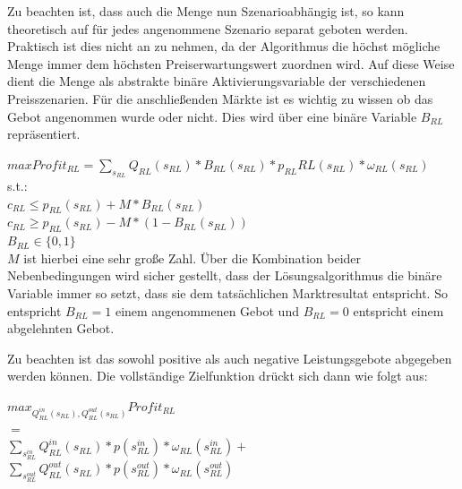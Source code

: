 Zu beachten ist, dass auch die Menge nun Szenarioabhängig ist, so kann theoretisch auf für jedes angenommene Szenario separat geboten werden. Praktisch ist dies nicht an zu nehmen, da der Algorithmus die höchst mögliche Menge immer dem höchsten Preiserwartungswert  zuordnen wird. Auf diese Weise dient die Menge als abstrakte binäre Aktivierungsvariable der verschiedenen Preisszenarien.
Für die anschließenden Märkte ist es wichtig zu wissen ob das Gebot angenommen wurde oder nicht. Dies wird über eine binäre Variable $B_{RL}$ repräsentiert.

$max Profit_{RL} = \sum_{s_{RL}} Q_{RL}(s_{RL}) * B_{RL}(s_{RL}) * p_{RL}{RL}(s_{RL}) * \omega_{RL}(s_{RL})$\\
s.t.:\\
$c_{RL} \leq p_{RL}(s_{RL}) + M * B_{RL}(s_{RL}) $\\
$c_{RL} \geq p_{RL}(s_{RL}) - M * (1 - B_{RL}(s_{RL})) $\\
$B_{RL} \in \{0,1\}$\\
$M$ ist hierbei eine sehr große Zahl. Über die Kombination beider Nebenbedingungen wird sicher gestellt, dass der Lösungsalgorithmus die binäre Variable immer so setzt, dass sie dem tatsächlichen Marktresultat entspricht. So entspricht $B_{RL} = 1$ einem angenommenen Gebot und $B_{RL} = 0$ entspricht einem abgelehnten Gebot.\\




Zu beachten ist das sowohl positive als auch negative Leistungsgebote abgegeben werden können. Die vollständige Zielfunktion drückt sich dann wie folgt aus:\\

\begin{center}
	$max_{Q^{in}_{RL}(s_{RL}), Q^{out}_{RL}(s_{RL})} Profit_{RL}$\\
	$=$\\
	$\sum_{s^{in}_{RL}} Q^{in}_{RL}(s_{RL}) * p(s^{in}_{RL}) * \omega_{RL}(s^{in}_{RL}) +$\\
	$\sum_{s^{out}_{RL}} Q^{out}_{RL}(s_{RL}) * p(s^{out}_{RL}) * \omega_{RL}(s^{out}_{RL})$\\
\end{center}


